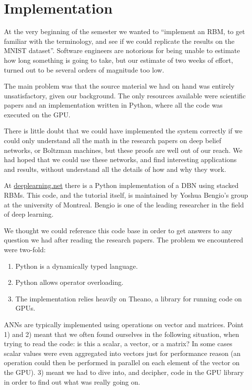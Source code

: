 \documentclass[11pt]{article}
\begin{document}
\section{Implementation}

At the very beginning of the semester we wanted to ``implement an RBM, to get familiar with the terminology, and see if we could replicate the results on the MNIST dataset''.  Software engineers are notorious for being unable to estimate how long something is going to take, but our estimate of two weeks of effort, turned out to be several orders of magnitude too low.

The main problem was that the source material we had on hand was entirely unsatisfactory, given our background.  The only resources available were scientific papers and an implementation written in Python, where all the code was executed on the GPU.

There is little doubt that we could have implemented the system correctly if we could only understand all the math in the research papers on deep belief networks, or Boltzman machines, but these proofs are well out of our reach.  We had hoped that we could use these networks, and find interesting applications and results, without understand all the details of how and why they work.

At \href{http://deeplearning.net/tutorial}{deeplearning.net} there is a Python implementation of a DBN using stacked RBMs.  This code, and the tutorial itself, is maintained by Yoshua Bengio's group at the university of Montreal.  Bengio is one of the leading researcher in the field of deep learning.

We thought we could reference this code base in order to get answers to any question we had after reading the research papers.  The problem we encountered were two-fold:

\begin{enumerate}
 \item Python is a dynamically typed language.
 \item Python allows operator overloading.
 \item The implementation relies heavily on Theano, a library for running code on GPUs.
\end{enumerate}

ANNs are typically implemented using operations on vector and matrices.  Point 1) and 2) meant that we often found ourselves in the following situation, when trying to read the code: is this a scalar, a vector, or a matrix?  In some cases scalar values were even aggregated into vectors just for performance reason (an operation could then be performed in parallel on each element of the vector on the GPU).  3) meant we had to dive into, and decipher, code in the GPU library in order to find out what was really going on.
\end{document}

